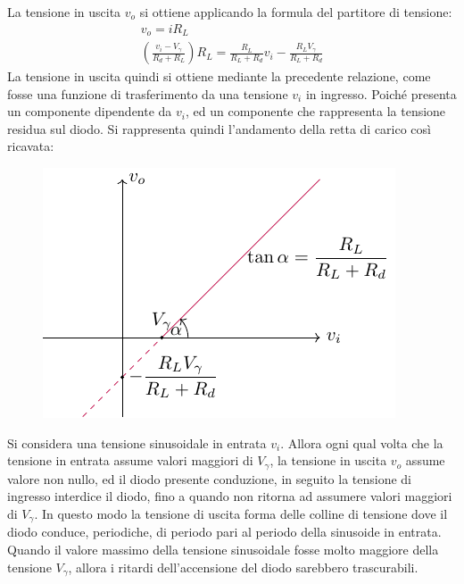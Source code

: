 \documentclass{article}
\numberwithin{equation}{subsection}
\begin{document}
La tensione in uscita $v_o$ si ottiene applicando la formula del partitore di tensione:
\begin{gather*}
    v_o=iR_L\\
    \left(\displaystyle\frac{v_i-V_{\gamma}}{R_d+R_L}\right)R_L=\frac{R_L}{R_L+R_d}v_i-\frac{R_LV_{\gamma}}{R_L+R_d}
\end{gather*}
La tensione in uscita quindi si ottiene mediante la precedente relazione, come fosse una funzione di trasferimento da una tensione $v_i$ in ingresso. 
Poiché presenta un componente dipendente da $v_i$, ed un componente che rappresenta la tensione residua sul diodo. Si rappresenta quindi l'andamento 
della retta di carico così ricavata:
\begin{figure}[H]%
    \centering
    \includegraphics{transcaratteristica.pdf}%
    \label{fig:transcaratteristica}
\end{figure}
Si considera una tensione sinusoidale in entrata $v_i$. 
Allora ogni qual volta che la tensione in entrata assume valori maggiori di $V_{\gamma}$, la tensione in uscita $v_o$ assume valore non nullo, ed il 
diodo presente conduzione, in seguito la tensione di ingresso interdice il diodo, fino a quando non ritorna ad assumere valori maggiori di $V_{\gamma}$. 
In questo modo la tensione di uscita forma delle colline di tensione dove il diodo conduce, periodiche, di periodo pari al periodo della sinusoide in 
entrata. Quando il valore massimo della tensione sinusoidale fosse molto maggiore della tensione $V_{\gamma}$, allora i ritardi dell'accensione del 
diodo sarebbero trascurabili. 
\end{document}
